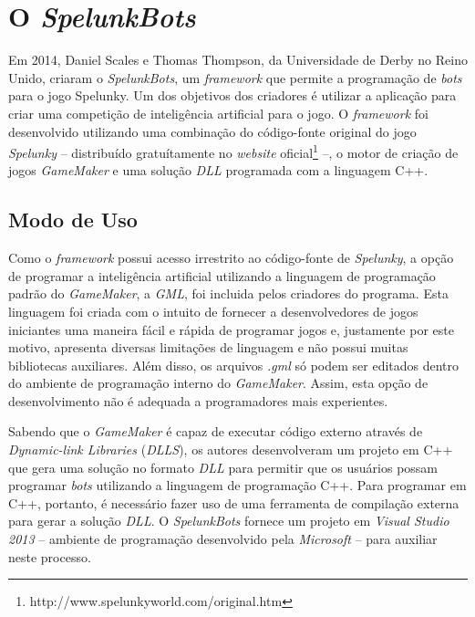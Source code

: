 \section{\label{section:spelunkbots}O \textit{SpelunkBots}}
Em 2014, Daniel Scales e Thomas Thompson, da Universidade de Derby no Reino
Unido, criaram o \textit{SpelunkBots}\cite{SPELUNKBOTSPAPER}, um
\textit{framework} que permite a programação de \textit{bots} para o jogo
Spelunky. Um dos objetivos dos criadores é utilizar a aplicação para criar uma
competição de inteligência artificial para o jogo. O \textit{framework} foi
desenvolvido utilizando uma combinação do código-fonte original do jogo
\textit{Spelunky} -- distribuído gratuítamente no \textit{website}
oficial\footnote{http://www.spelunkyworld.com/original.htm} --, o motor de
criação de jogos \textit{GameMaker} e uma solução \textit{DLL} programada com a
linguagem C++.


\subsection{\label{section:spelunkbots-usage}Modo de Uso}
Como o \textit{framework} possui acesso irrestrito ao código-fonte de
\textit{Spelunky}, a opção de programar a inteligência artificial utilizando a
linguagem de programação padrão do \textit{GameMaker}, a \textit{GML}, foi
incluida pelos criadores do programa. Esta linguagem foi criada com o intuito de
fornecer a desenvolvedores de jogos iniciantes uma maneira fácil e rápida de
programar jogos e, justamente por este motivo, apresenta diversas limitações de
linguagem e não possui muitas bibliotecas auxiliares. Além disso, os arquivos
\textit{.gml} só podem ser editados dentro do ambiente de programação interno do
\textit{GameMaker}. Assim, esta opção de desenvolvimento não é adequada a
programadores mais experientes.

Sabendo que o \textit{GameMaker} é capaz de executar código externo através de
\textit{Dynamic-link Libraries} (\textit{DLLS}), os autores desenvolveram um
projeto em C++ que gera uma solução no formato \textit{DLL} para permitir que os
usuários possam programar \textit{bots} utilizando a linguagem de programação
C++. Para programar em C++, portanto,  é necessário fazer uso de uma ferramenta de
compilação externa para gerar a solução \textit{DLL}. O \textit{SpelunkBots}
fornece um projeto em \textit{Visual Studio 2013} -- ambiente de programação
desenvolvido pela \textit{Microsoft} -- para auxiliar neste processo.

